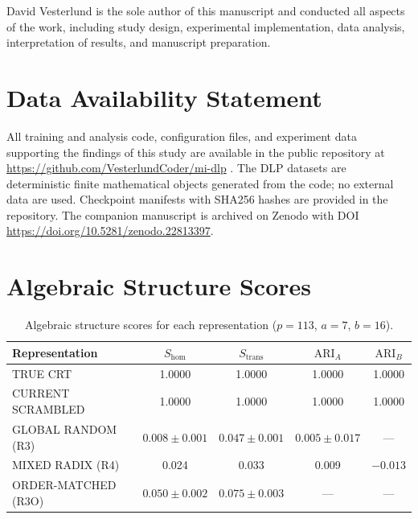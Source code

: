 \documentclass[11pt,a4paper]{article}
\theoremstyle{definition}
\theoremstyle{remark}
\newcommand{\Shom}{S_{\mathrm{hom}}}
\newcommand{\Strans}{S_{\mathrm{trans}}}
\newcommand{\ARI}{\mathrm{ARI}}
\begin{document}
David Vesterlund is the sole author of this manuscript and conducted all aspects of the work, including study design, experimental implementation, data analysis, interpretation of results, and manuscript preparation.

\section*{Data Availability Statement}

All training and analysis code, configuration files, and experiment data supporting the findings of this study are available in the public repository at \url{https://github.com/VesterlundCoder/mi-dlp} \citep{vesterlund2026mi_dlp_repo}. The DLP datasets are deterministic finite mathematical objects generated from the code; no external data are used. Checkpoint manifests with SHA256 hashes are provided in the repository. The companion manuscript \citep{vesterlund2026grokking} is archived on Zenodo with DOI \url{https://doi.org/10.5281/zenodo.22813397}.




\appendix
\section{Algebraic Structure Scores}
\label{app:tables}

\begin{table}[h]
\centering
\caption{Algebraic structure scores for each representation ($p = 113$, $a = 7$, $b = 16$).}
\label{tab:structure}
\begin{tabular}{lcccc}
\toprule
Representation & $\Shom$ & $\Strans$ & $\ARI_A$ & $\ARI_B$ \\
\midrule
TRUE CRT & 1.0000 & 1.0000 & 1.0000 & 1.0000 \\
CURRENT SCRAMBLED & 1.0000 & 1.0000 & 1.0000 & 1.0000 \\
GLOBAL RANDOM (R3) & $0.008 \pm 0.001$ & $0.047 \pm 0.001$ & $0.005 \pm 0.017$ & --- \\
MIXED RADIX (R4) & 0.024 & 0.033 & 0.009 & $-0.013$ \\
ORDER-MATCHED (R3O) & $0.050 \pm 0.002$ & $0.075 \pm 0.003$ & --- & --- \\
\bottomrule
\end{tabular}
\end{table}
\end{document}
